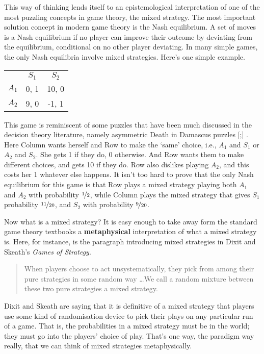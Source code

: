 \documentclass[11pt,]{book}
\def\toprule{}
\def\bottomrule{}
\begin{document}
This way of thinking lends itself to an epistemological interpretation of one of the most puzzling concepts in game theory, the mixed strategy. The most important solution concept in modern game theory is the Nash equilibrium. A set of moves is a Nash equilibrium if no player can improve their outcome by deviating from the equilibrium, conditional on no other player deviating. In many simple games, the only Nash equilibria involve mixed strategies. Here's one simple example.

\begin{longtable}[]{@{}lcc@{}}
\toprule
\endhead
& \(S_1\) & \(S_2\)\tabularnewline
\(A_1\) & 0, 1 & 10, 0\tabularnewline
\(A_2\) & 9, 0 & -1, 1\tabularnewline
\bottomrule
\end{longtable}

This game is reminiscent of some puzzles that have been much discussed in the decision theory literature, namely asymmetric Death in Damascus puzzles {[}\citet{Richter1984};{]} . Here Column wants herself and Row to make the `same' choice, i.e., \(A_1\) and \(S_1\) or \(A_2\) and \(S_2\). She gets 1 if they do, 0 otherwise. And Row wants them to make different choices, and gets 10 if they do. Row also dislikes playing \(A_2\), and this costs her 1 whatever else happens. It isn't too hard to prove that the only Nash equilibrium for this game is that Row plays a mixed strategy playing both \(A_1\) and \(A_2\) with probability \(\nicefrac{1}{2}\), while Column plays the mixed strategy that gives \(S_1\) probability \(\nicefrac{11}{20}\), and \(S_2\) with probability \(\nicefrac{9}{20}\).

Now what is a mixed strategy? It is easy enough to take away form the standard game theory textbooks a \textbf{metaphysical} interpretation of what a mixed strategy is. Here, for instance, is the paragraph introducing mixed strategies in Dixit and Skeath's \emph{Games of Strategy}.

\begin{quote}
When players choose to act unsystematically, they pick from among their pure strategies in some random way \ldots{}We call a random mixture between these two pure strategies a mixed strategy. \citep[ 186]{DixitSkeath2004}
\end{quote}

Dixit and Skeath are saying that it is definitive of a mixed strategy that players use some kind of randomisation device to pick their plays on any particular run of a game. That is, the probabilities in a mixed strategy must be in the world; they must go into the players' choice of play. That's one way, the paradigm way really, that we can think of mixed strategies metaphysically.
\end{document}
